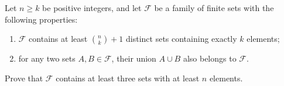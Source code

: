 \documentclass{article}
\begin{document}
\setlength{\parindent}{0pt}
Let $n\ge k$ be positive integers, and let $\mathcal{F}$ be a family of finite sets with the following properties:
\begin{enumerate}[label=(\roman*)]
\item $\mathcal{F}$ contains at least $\binom{n}{k}+1$ distinct sets containing exactly $k$ elements;
\item for any two sets $A,B\in \mathcal{F}$, their union $A\cup B$ also belongs to $\mathcal{F}$.
\end{enumerate}
Prove that $\mathcal{F}$ contains at least three sets with at least $n$ elements.
\end{document}

